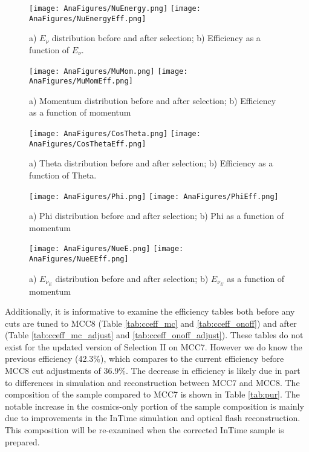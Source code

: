 \documentclass[12pt]{article}
\begin{document}
\begin{figure}[h!]
\centering
\texttt{[image: AnaFigures/NuEnergy.png]}
\hspace{1 mm}
\texttt{[image: AnaFigures/NuEnergyEff.png]}
\caption{a) $E_\nu$ distribution before and after selection; b) Efficiency as a function of $E_\nu$. }
\texttt{[image: AnaFigures/MuMom.png]}
\hspace{1 mm}
\texttt{[image: AnaFigures/MuMomEff.png]}
\caption{a) Momentum distribution before and after selection; b) Efficiency as a function of momentum }
\end{figure}
\begin{figure}[h!]
\texttt{[image: AnaFigures/CosTheta.png]}
\hspace{1 mm}
\texttt{[image: AnaFigures/CosThetaEff.png]}
\caption{a) Theta distribution before and after selection; b) Efficiency as a function of Theta. }
\texttt{[image: AnaFigures/Phi.png]}
\hspace{1 mm}
\texttt{[image: AnaFigures/PhiEff.png]}
\caption{a) Phi distribution before and after selection; b) Phi as a function of momentum }
\end{figure}

\begin{figure}[h!]
\centering
\texttt{[image: AnaFigures/NueE.png]}
\hspace{1 mm}
\texttt{[image: AnaFigures/NueEEff.png]}
\caption{a) $E_{\nu_E}$ distribution before and after selection; b) $E_{\nu_E}$ as a function of momentum }
\label{fig:mcc8_effs}
\end{figure}

Additionally, it is informative to examine the efficiency tables both before any cuts are tuned to MCC8 (Table \ref{tab:cceff_mc} and \ref{tab:cceff_onoff}) and after (Table \ref{tab:cceff_mc_adjust} and \ref{tab:cceff_onoff_adjust}).  These tables do not exist for the updated version of Selection II on MCC7. However we do know the previous efficiency (42.3\%), which compares to the current efficiency before MCC8 cut adjustments of 36.9\%. The decrease in efficiency is likely due in part to differences in simulation and reconstruction between MCC7 and MCC8. The composition of the sample compared to MCC7 is shown in Table \ref{tab:pur}.  The notable increase in the cosmics-only portion of the sample composition is mainly due to improvements in the InTime simulation and optical flash reconstruction. This composition will be re-examined when the corrected InTime sample is prepared.
\end{document}
